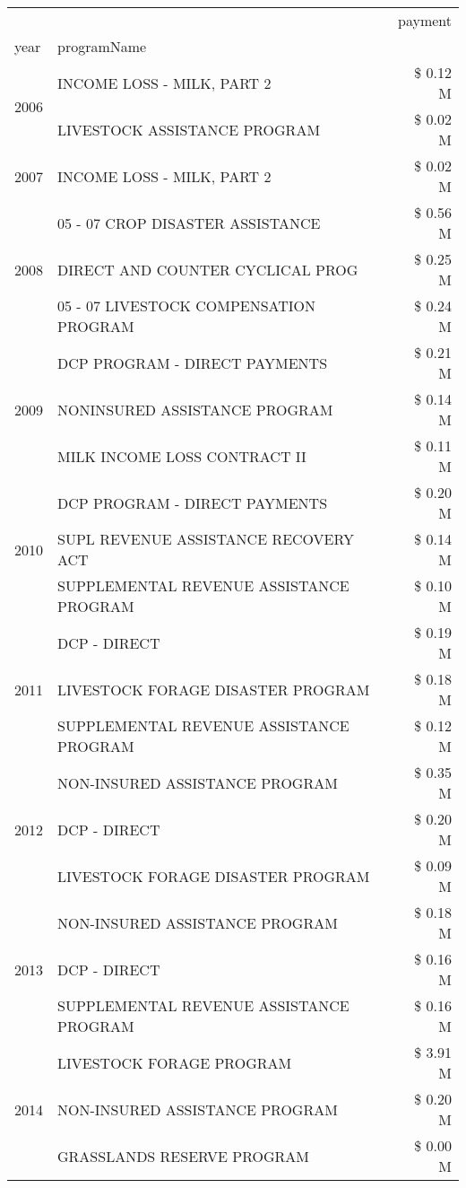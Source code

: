 \begin{tabular}{llr}
\toprule
 &  & payment \\
year & programName &  \\
\midrule
\multirow[t]{2}{*}{2006} & INCOME LOSS - MILK, PART 2 & \$ 0.12 M \\
 & LIVESTOCK ASSISTANCE PROGRAM & \$ 0.02 M \\
\cline{1-3}
2007 & INCOME LOSS - MILK, PART 2 & \$ 0.02 M \\
\cline{1-3}
\multirow[t]{3}{*}{2008} & 05 - 07 CROP DISASTER ASSISTANCE & \$ 0.56 M \\
 & DIRECT AND COUNTER CYCLICAL PROG & \$ 0.25 M \\
 & 05 - 07 LIVESTOCK COMPENSATION PROGRAM & \$ 0.24 M \\
\cline{1-3}
\multirow[t]{3}{*}{2009} & DCP PROGRAM - DIRECT PAYMENTS & \$ 0.21 M \\
 & NONINSURED ASSISTANCE PROGRAM & \$ 0.14 M \\
 & MILK INCOME LOSS CONTRACT II & \$ 0.11 M \\
\cline{1-3}
\multirow[t]{3}{*}{2010} & DCP PROGRAM - DIRECT PAYMENTS & \$ 0.20 M \\
 & SUPL REVENUE ASSISTANCE RECOVERY ACT & \$ 0.14 M \\
 & SUPPLEMENTAL REVENUE ASSISTANCE PROGRAM & \$ 0.10 M \\
\cline{1-3}
\multirow[t]{3}{*}{2011} & DCP - DIRECT & \$ 0.19 M \\
 & LIVESTOCK FORAGE DISASTER PROGRAM & \$ 0.18 M \\
 & SUPPLEMENTAL REVENUE ASSISTANCE PROGRAM & \$ 0.12 M \\
\cline{1-3}
\multirow[t]{3}{*}{2012} & NON-INSURED ASSISTANCE PROGRAM & \$ 0.35 M \\
 & DCP - DIRECT & \$ 0.20 M \\
 & LIVESTOCK FORAGE DISASTER PROGRAM & \$ 0.09 M \\
\cline{1-3}
\multirow[t]{3}{*}{2013} & NON-INSURED ASSISTANCE PROGRAM & \$ 0.18 M \\
 & DCP - DIRECT & \$ 0.16 M \\
 & SUPPLEMENTAL REVENUE ASSISTANCE PROGRAM & \$ 0.16 M \\
\cline{1-3}
\multirow[t]{3}{*}{2014} & LIVESTOCK FORAGE PROGRAM & \$ 3.91 M \\
 & NON-INSURED ASSISTANCE PROGRAM & \$ 0.20 M \\
 & GRASSLANDS RESERVE PROGRAM & \$ 0.00 M \\

\end{tabular}
